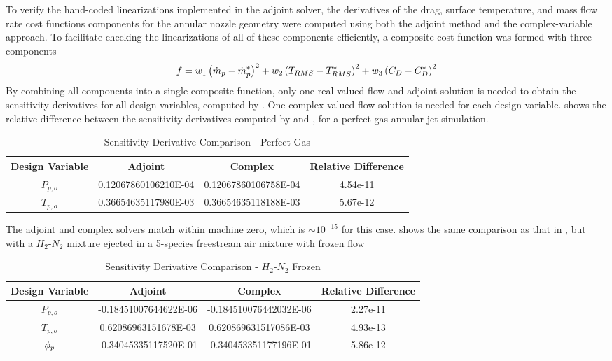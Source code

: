 To verify the hand-coded linearizations implemented in the adjoint solver, the
derivatives of the drag, surface temperature, and mass flow rate cost functions
components for the annular nozzle geometry were computed using both the adjoint
method and the complex-variable approach.  To facilitate checking the
linearizations of all of these components efficiently, a composite cost function
was formed with three components
\begin{equation} 
  f = w_1\left( \dot{m}_p - \dot{m}_p^{*}\right)^{2} 
  + w_2\left( T_{RMS} - T_{RMS}^*\right)^2
  + w_3\left( C_{D} - C_{D}^*\right)^2
  \label{check-cost-func}
\end{equation}
By combining all components into a single composite function, only one
real-valued flow and adjoint solution is needed to obtain the sensitivity
derivatives for all design variables, computed by . One
complex-valued flow solution is needed for each design variable.
 shows the relative difference between the sensitivity
derivatives computed by  and , for a
perfect gas annular jet simulation.
\begin{table}[h]
  \centering 
  \begin{tabular}{c|c|c|c} 
    Design Variable & Adjoint & Complex & Relative Difference \\ 
    \hline 
    $P_{p,o}$ & 0.12067860106210E-04 & 0.12067860106758E-04 & 4.54e-11 \\
    $T_{p,o}$ & 0.36654635117980E-03 & 0.36654635118188E-03 & 5.67e-12 
  \end{tabular}
  \caption{Sensitivity Derivative Comparison - Perfect Gas}
  \label{tab:pg-deriv-check}
\end{table}
The adjoint and complex solvers match within machine zero, which is $\sim
10^{-15}$ for this case.   shows the same
comparison as that in , but with a $H_2$-$N_2$ mixture
ejected in a 5-species freestream air mixture with frozen flow
\begin{table}[h] 
  \centering 
  \begin{tabular}{c|c|c|c} 
    Design Variable & Adjoint & Complex & Relative Difference\\
    \hline 
    $P_{p,o}$ & -0.18451007644622E-06 & -0.184510076442032E-06 & 2.27e-11 \\ 
    $T_{p,o}$ &  0.62086963151678E-03 &  0.620869631517086E-03 & 4.93e-13 \\ 
    $\phi_p$     & -0.34045335117520E-01 & -0.340453351177196E-01 & 5.86e-12 
  \end{tabular}
  \caption{Sensitivity Derivative Comparison - $H_2$-$N_2$ Frozen}
  \label{tab:frozen-deriv-check}
\end{table}
